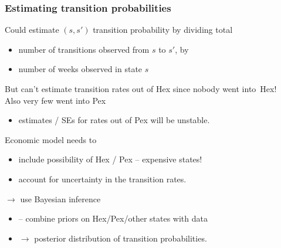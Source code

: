 \begin{frame}

\frametitle{Estimating transition probabilities}


 Could estimate $(s,s')$ transition probability by dividing total 
\begin{itemize}
\item number of transitions observed from $s$ to $s'$, by 
\item number of weeks observed in state $s$ 
\end{itemize}

 But can't estimate transition rates out of Hex since nobody went
  into~Hex! \\
 Also very few went into Pex
  \begin{itemize}
  \item estimates / SEs for rates \alert{out of} Pex will be unstable.
  \end{itemize}

 Economic model needs to
  \begin{itemize}
  \item   include possibility of Hex / Pex --
  expensive states! 
\item account for \alert{uncertainty} in the transition
  rates.
  \end{itemize}



  $\rightarrow$ use Bayesian inference
  \begin{itemize}
  \item   -- combine \alert{priors} on
Hex/Pex/other states with data
\item  $\rightarrow$ \alert{posterior}
distribution of transition probabilities.
  \end{itemize}

\end{frame}


